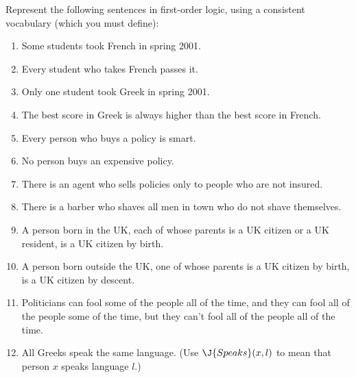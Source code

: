 \begin{uexercise}
Represent the following sentences in first-order logic, using a consistent
vocabulary (which you must define):
\begin{enumerate}
\item Some students took French in spring 2001.
\item Every student who takes French passes it.
\item Only one student took Greek in spring 2001.
\item The best score in Greek is always higher than the best score in French.
\item Every person who buys a policy is smart.
\item No person buys an expensive policy.
\item There is an agent who sells policies only to people who are not insured.
\item There is a barber who shaves all men in town who do not shave themselves.
\item A person born in the UK, each of whose parents is a UK citizen or a UK resident, is a UK citizen by birth.
\item A person born outside the UK, one of whose parents is a UK citizen by birth, is a UK citizen
by descent.
\item Politicians can fool some of the people all of the time, and they can fool
all of the people some of the time, but they can't fool all of the people all
of the time.
\item All Greeks speak the same language. (Use \(\J{Speaks}(x,l)\) to mean that person \(x\)
speaks language \(l\).)
\end{enumerate}
\end{uexercise} 

